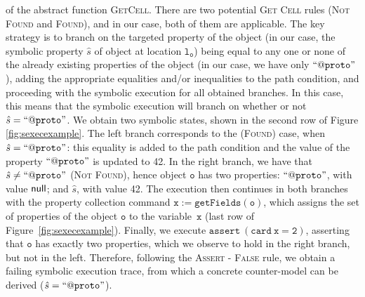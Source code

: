 of the abstract function \textsc{GetCell}. There are two potential \textsc{Get Cell} rules (\textsc{Not Found} and \textsc{Found}), and in our case, both of them are applicable. The key strategy is to branch on the targeted property of the object (in our case, the symbolic property $\hat{s}$ of object at location $\mathtt{l_o}$) being equal to any one or none of the already existing properties of the object (in our case, we have only $\mathtt{``@proto"}$), adding the appropriate equalities and/or inequalities to the path condition, and proceeding with the symbolic execution for all obtained branches. In this case, this means that the symbolic execution will branch on whether or not $\hat{s} = \mathtt{``@proto"}$. We obtain two symbolic states, shown in the second row of Figure \ref{fig:sexecexample}. The left branch corresponds to the (\textsc{Found}) case, when $\hat{s} = \mathtt{``@proto"}$: this equality is added to the path condition and the value of the property $\mathtt{``@proto"}$ is updated to 42. In the right branch, we have that $\hat{s} \neq \mathtt{``@proto"}$ (\textsc{Not Found}), hence object $\mathtt{o}$ has two properties: $ \mathtt{``@proto"}$, with value ${\sf null}$; and $\hat{s}$, with value 42.
The execution then continues in both branches with the property collection command $\mathtt{x := getFields(o)}$, which assigns the set of properties of the object $\mathtt{o}$ to the variable~$\mathtt{x}$ (last row of Figure~\ref{fig:sexecexample}). Finally, we execute $\mathtt{assert\ (card \ x = 2)}$, asserting that $\mathtt{o}$ has exactly two properties, which we observe to hold in the right branch, but not in the left.
Therefore, following the \textsc{Assert - False} rule, we obtain a failing symbolic execution trace, from which a concrete counter-model can be derived ($\hat{s} = \mathtt{``@proto"}$).




